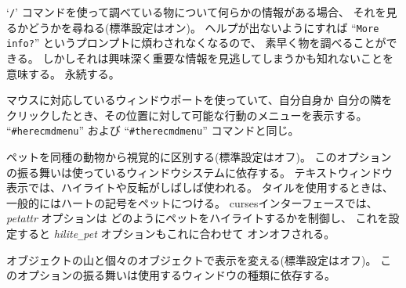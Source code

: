 `{\tt /}' コマンドを使って調べている物について何らかの情報がある場合、
それを見るかどうかを尋ねる(標準設定はオン)。
ヘルプが出ないようにすれば ``{\tt More info?}'' というプロンプトに煩わされなくなるので、
素早く物を調べることができる。
しかしそれは興味深く重要な情報を見逃してしまうかも知れないことを意味する。
永続する。
\item[\ib{herecmd\verb+_+menu}]
マウスに対応しているウィンドウポートを使っていて、自分自身か
自分の隣をクリックしたとき、その位置に対して可能な行動のメニューを表示する。
``{\tt \#herecmdmenu}'' および ``{\tt \#therecmdmenu}'' コマンドと同じ。
\item[\ib{hilite\verb+_+pet}]
ペットを同種の動物から視覚的に区別する(標準設定はオフ)。
このオプションの振る舞いは使っているウィンドウシステムに依存する。
テキストウィンドウ表示では、ハイライトや反転がしばしば使われる。
タイルを使用するときは、一般的にはハートの記号をペットにつける。
cursesインターフェースでは、{\it petattr\/} オプションは
どのようにペットをハイライトするかを制御し、
これを設定すると {\it hilite\verb+_+pet\/} オプションもこれに合わせて
オンオフされる。
\item[\ib{hilite\verb+_+pile}]
オブジェクトの山と個々のオブジェクトで表示を変える(標準設定はオフ)。
このオプションの振る舞いは使用するウィンドウの種類に依存する。
